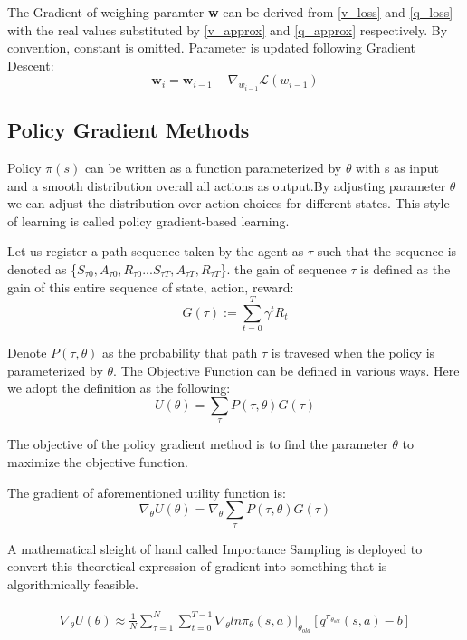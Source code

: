 The Gradient of weighing paramter \textbf{w} can be derived from \ref{v_loss} and \ref{q_loss} with the real values substituted by \ref{v_approx} and \ref{q_approx} respectively. By convention, constant is omitted. Parameter is updated following Gradient Descent:
\begin{equation}
\textbf{w}_{i}=\textbf{w}_{i-1}-\nabla_{w_{i-1}} \mathcal{L}(w_{i-1})
\end{equation}
\subsection{Policy Gradient Methods}
Policy $\pi(s)$ can be written as a function parameterized by $\theta$ with s as input and a smooth distribution overall all actions as output.By adjusting parameter $\theta$ we can adjust the distribution over action choices for different states. This style of learning is called policy gradient-based learning.

Let us register a path sequence taken by the agent as $\tau$ such that the sequence is denoted as \{$S_{\tau 0},A_{\tau 0}, R_{\tau 0}...S_{\tau T},A_{\tau T},R_{\tau T}$\}. the gain of sequence $\tau$ is defined as the gain of this entire sequence of state, action, reward:
\begin{equation}
    G(\tau):=\displaystyle\sum_{t=0}^{T}\gamma^t R_t
\end{equation}

Denote $P(\tau,\theta)$ as the probability that path $\tau$ is travesed when the policy is parameterized by $\theta$. The Objective Function can be defined in various ways. Here we adopt the definition as the following:
\begin{equation}
    U(\theta)=\sum_{\tau}P(\tau,\theta)G(\tau)
\end{equation}


The objective of the policy gradient method is to find the parameter $\theta$ to maximize the objective function.

The gradient of aforementioned utility function is:
\begin{equation}
    \nabla_{\theta} U(\theta)= \nabla_{\theta}\sum_{\tau}P(\tau,\theta) G(\tau)
\end{equation}

A mathematical sleight of hand called Importance Sampling is deployed to convert this theoretical expression of gradient into something that is algorithmically feasible.

\begin{align}
\begin{split}
\nabla_{\theta} U(\theta) \approx \frac{1}{N}\displaystyle\sum_{\tau=1}^{N}\displaystyle\sum_{t=0}^{T-1} \nabla_{\theta}ln\pi_{\theta}(s,a)|_{\theta_{old}}[q^{\pi_{\theta_{old}}}(s,a)-b]\\
\end{split}
\end{align}

